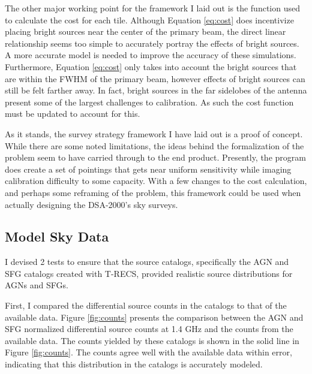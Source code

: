 \documentclass{article}
\begin{document}
\begin{multicols*}{2}
The other major working point for the framework I laid out is the function used to calculate the cost for each tile. Although Equation \ref{eq:cost} does incentivize placing bright sources near the center of the primary beam, the direct linear relationship seems too simple to accurately portray the effects of bright sources. A more accurate model is needed to improve the accuracy of these simulations. Furthermore, Equation \ref{eq:cost} only takes into account the bright sources that are within the FWHM of the primary beam, however effects of bright sources can still be felt farther away. In fact, bright sources in the far sidelobes of the antenna present some of the largest challenges to calibration. As such the cost function must be updated to account for this.

As it stands, the survey strategy framework I have laid out is a proof of concept. While there are some noted limitations, the ideas behind the formalization of the problem seem to have carried through to the end product. Presently, the program does create a set of pointings that gets near uniform sensitivity while imaging calibration difficulty to some capacity. With a few changes to the cost calculation, and perhaps some reframing of the problem, this framework could be used when actually designing the DSA-2000's sky surveys.

\subsection{Model Sky Data}

I devised 2 tests to ensure that the source catalogs, specifically the AGN and SFG catalogs created with T-RECS, provided realistic source distributions for AGNs and SFGs.

First, I compared the differential source counts in the catalogs to that of the available data. Figure \ref{fig:counts} presents the comparison between the AGN and SFG normalized differential source counts at 1.4 GHz and the counts from the available data. The counts yielded by these catalogs is shown in the solid line in Figure \ref{fig:counts}. The counts agree well with the available data within error, indicating that this distribution in the catalogs is accurately modeled. 


\end{multicols*}
\end{document}
